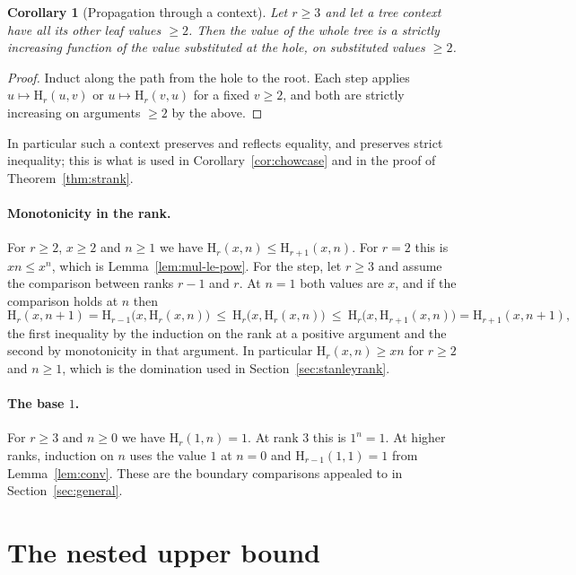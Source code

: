 \documentclass[11pt,a4paper]{article}
\theoremstyle{plain}
\newtheorem{corollary}[theorem]{Corollary}
\theoremstyle{definition}
\newcommand{\HH}{\mathrm{H}}
\begin{document}
\begin{corollary}[Propagation through a context]\label{cor:context}
Let $r\ge3$ and let a tree context have all its other leaf values $\ge2$. Then the value
of the whole tree is a strictly increasing function of the value substituted at the hole,
on substituted values $\ge2$.
\end{corollary}

\begin{proof}
Induct along the path from the hole to the root. Each step applies
$u\mapsto\HH_r(u,v)$ or $u\mapsto\HH_r(v,u)$ for a fixed $v\ge2$, and both are strictly
increasing on arguments $\ge2$ by the above.
\end{proof}

In particular such a context preserves and reflects equality, and preserves strict
inequality; this is what is used in Corollary~\ref{cor:chowcase} and in the proof of
Theorem~\ref{thm:strank}.

\paragraph{Monotonicity in the rank.}
For $r\ge2$, $x\ge2$ and $n\ge1$ we have $\HH_r(x,n)\le\HH_{r+1}(x,n)$. For $r=2$ this
is $xn\le x^{n}$, which is Lemma~\ref{lem:mul-le-pow}. For the step, let $r\ge3$ and
assume the comparison between ranks $r-1$ and $r$. At $n=1$ both values are $x$, and if
the comparison holds at $n$ then
\[
 \HH_r(x,n+1)=\HH_{r-1}\bigl(x,\HH_r(x,n)\bigr)
 \ \le\ \HH_r\bigl(x,\HH_r(x,n)\bigr)
 \ \le\ \HH_r\bigl(x,\HH_{r+1}(x,n)\bigr)=\HH_{r+1}(x,n+1),
\]
the first inequality by the induction on the rank at a positive argument and the second
by monotonicity in that argument. In particular $\HH_r(x,n)\ge xn$ for $r\ge2$ and
$n\ge1$, which is the domination used in Section~\ref{sec:stanleyrank}.

\paragraph{The base $1$.}
For $r\ge3$ and $n\ge0$ we have $\HH_r(1,n)=1$. At rank $3$ this is $1^{n}=1$. At higher
ranks, induction on $n$ uses the value $1$ at $n=0$ and $\HH_{r-1}(1,1)=1$ from
Lemma~\ref{lem:conv}. These are the boundary comparisons appealed to in
Section~\ref{sec:general}.

\section{The nested upper bound}\label{app:nest}
\end{document}
